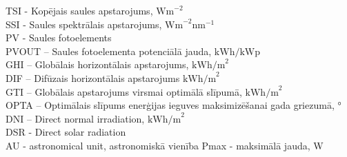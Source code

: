 \noindent TSI - Kopējais saules apstarojums, $\textrm{Wm}^{-2}$\\
SSI - Saules spektrālais apstarojums, $\textrm{Wm}^{-2}\textrm{nm}^{-1}$\\
PV - Saules fotoelements\\ %
PVOUT – Saules fotoelementa potenciālā jauda, $\textrm{kWh/kWp}$\\ %
GHI – Globālais horizontālais apstarojums,  $\textrm{kWh/m}^2$\\ %
DIF – Difūzais horizontālais apstarojums  $\textrm{kWh/m}^2$\\ %
GTI – Globālais apstarojums virsmai optimālā slīpumā, $\textrm{kWh/m}^2$\\ %
OPTA – Optimālais slīpums enerģijas ieguves maksimizēšanai gada griezumā, °\\ %
DNI – Direct normal irradiation, $\textrm{kWh/m}^2$\\ %
DSR - Direct solar radiation\\
AU - astronomical unit, astronomiskā vienība
Pmax - maksimālā jauda, W

